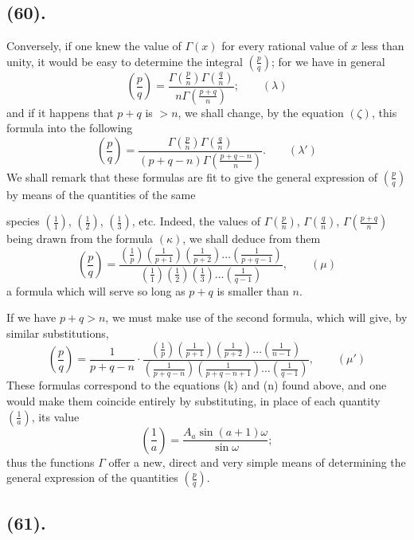 \documentclass{article}
\begin{document}
\subsection*{(60).}

Conversely, if one knew the value of $\Gamma(x)$ for every rational value of $x$ less than unity, it would be easy to determine the integral $\left(\frac{p}{q}\right)$; for we have in general
\[ \left(\frac{p}{q}\right)=\frac{\Gamma\left(\frac{p}{n}\right)\Gamma\left(\frac{q}{n}\right)}{n\Gamma\left(\frac{p+q}{n}\right)};\qquad(\lambda) \]
and if it happens that $p+q$ is $>n$, we shall change, by the equation $(\zeta)$, this formula into the following
\[ \left(\frac{p}{q}\right)=\frac{\Gamma\left(\frac{p}{n}\right)\Gamma\left(\frac{q}{n}\right)}{(p+q-n)\Gamma\left(\frac{p+q-n}{n}\right)}.\qquad(\lambda') \]
We shall remark that these formulas are fit to give the general expression of $\left(\frac{p}{q}\right)$ by means of the quantities of the same

species $\left(\frac{1}{1}\right)$, $\left(\frac{1}{2}\right)$, $\left(\frac{1}{3}\right)$, etc. Indeed, the values of $\Gamma\left(\frac{p}{n}\right)$, $\Gamma\left(\frac{q}{n}\right)$, $\Gamma\left(\frac{p+q}{n}\right)$ being drawn from the formula $(\kappa)$, we shall deduce from them
\[ \left(\frac{p}{q}\right)=\frac{\left(\frac{1}{p}\right)\left(\frac{1}{p+1}\right)\left(\frac{1}{p+2}\right)\ldots\left(\frac{1}{p+q-1}\right)}{\left(\frac{1}{1}\right)\left(\frac{1}{2}\right)\left(\frac{1}{3}\right)\ldots\left(\frac{1}{q-1}\right)},\qquad(\mu) \]
a formula which will serve so long as $p+q$ is smaller than $n$.

If we have $p+q>n$, we must make use of the second formula, which will give, by similar substitutions,
\[ \left(\frac{p}{q}\right)=\frac{1}{p+q-n}\cdot\frac{\left(\frac{1}{p}\right)\left(\frac{1}{p+1}\right)\left(\frac{1}{p+2}\right)\ldots\left(\frac{1}{n-1}\right)}{\left(\frac{1}{p+q-n}\right)\left(\frac{1}{p+q-n+1}\right)\ldots\left(\frac{1}{q-1}\right)},\qquad(\mu') \]
These formulas correspond to the equations (k) and (n) found above, and one would make them coincide entirely by substituting, in place of each quantity $\left(\frac{1}{a}\right)$, its value
\[ \left(\frac{1}{a}\right)=\frac{A_{a}\sin(a+1)\omega}{\sin\omega}; \]
thus the functions $\Gamma$ offer a new, direct and very simple means of determining the general expression of the quantities $\left(\frac{p}{q}\right)$.

\subsection*{(61).}
\end{document}

